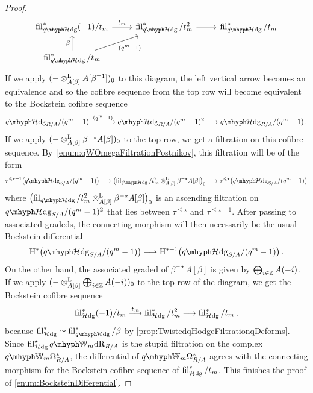 \documentclass[DIV=12,numbers=enddot,leqno,bibliography=totoc]{scrartcl}
\begin{document}
\begin{proof}
		\begin{equation*}
			\begin{tikzcd}
				\fil_{\qHhodge}^*(-1)/t_m\rar["t_m"] &  \fil_{\qHhodge}^*/t_m^2\rar &  \fil_{\qHhodge}^*/t_m\\
				\fil_{\qHhodge}^*/t_m\uar["\beta"]\urar["(q^m-1)"'] & &
			\end{tikzcd}
		\end{equation*}
		If we apply $(-\otimes^{\mathrm{L}}_{A[\beta]}A[\beta^{\pm 1}])_0$ to this diagram, the left vertical arrow becomes an equivalence and so the cofibre sequence from the top row will become equivalent to the Bockstein cofibre sequence
		\begin{equation*}
			\qHhodge_{R/A}/(q^m-1)\xrightarrow{(q^m-1)}\qHhodge_{R/A}/(q^m-1)^2\longrightarrow \qHhodge_{R/A}/(q^m-1)\,.
		\end{equation*}
		If we apply $(-\otimes^{\mathrm{L}}_{A[\beta]}\beta^{-\star}A[\beta])_0$ to the top row, we get a filtration on this cofibre sequence. By~\cref{enum:qWOmegaFiltrationPostnikov}, this filtration will be of the form
		\begin{equation*}
			\tau^{\leqslant \star+1}\bigl(\qHhodge_{S/A}/(q^m-1)\bigr)\longrightarrow\bigl( \fil_{\qHhodge}/t_m^2\lotimes_{A[\beta]}\beta^{-\star}A[\beta]\bigr)_0\longrightarrow\tau^{\leqslant \star }\bigl(\qHhodge_{S/A}/(q^m-1)\bigr)
		\end{equation*}
		where $\bigl( \fil_{\qHhodge}/t_m^2\lotimes_{A[\beta]}\beta^{-\star}A[\beta]\bigr)_0$ is an ascending filtration on $\qHhodge_{S/A}/(q^m-1)^2$ that lies between $\tau^{\leqslant \star}$ and $\tau^{\leqslant \star +1}$. After passing to associated gradeds, the connecting morphism will then necessarily be the usual Bockstein differential
		\begin{equation*}
			\H^*\bigl(\qHhodge_{S/A}/(q^m-1)\bigr)\longrightarrow \H^{*+1}\bigl(\qHhodge_{S/A}/(q^m-1)\bigr)\,.
		\end{equation*}
		On the other hand, the associated graded of $\beta^{-\star}A[\beta]$ is given by $\bigoplus_{i\in\mathbb{Z}}A(-i)$. If we apply $(-\otimes^{\mathrm{L}}_{A[\beta]}\bigoplus_{i\in\mathbb{Z}}A(-i))_0$ to the top row of the diagram, we get the Bockstein cofibre sequence
		\begin{equation*}
			\operatorname{fil}_{\mathcal{H}_{}\mathrm{dg}}^*(-1)/t_m\overset{t_m}{\longrightarrow} \operatorname{fil}_{\mathcal{H}_{}\mathrm{dg}}^*/t_m^2\longrightarrow \operatorname{fil}_{\mathcal{H}_{}\mathrm{dg}}^*/t_m\,,
		\end{equation*}
		because $ \fil_{\Hhodge}^*\simeq  \fil_{\qHhodge}^*/\beta$ by \cref{prop:TwistedqHodgeFiltrationqDeforms}. 
		Since $ \fil_{\Hhodge}^\star\qIW_m\deRham_{R/A}$ is the stupid filtration on the complex $\qIW_m\Omega_{R/A}^*$, the differential of $\qIW_m\Omega_{R/A}^*$ agrees with the connecting morphism for the Bockstein cofibre sequence of $ \operatorname{fil}_{\mathcal{H}_{}\mathrm{dg}}^*/t_m$. This finishes the proof of \cref{enum:BocksteinDifferential}.
	\end{proof}
	
\end{document}
